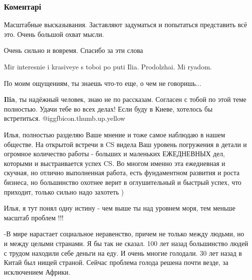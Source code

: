  
 
 
 
 
\subsubsection{Коментарі}

\begin{itemize} %
Масштабные высказывания. Заставляют задуматься и попытаться представить всё это. Очень большой охват мысли.

Очень сильно и вовремя. Спасибо за эти слова

Mir interesnie i krasiveye s toboi po puti Ilia. Prodolzhai. Mi ryadom.

По моим ощущениям, ты знаешь что-то еще, о чем не говоришь...

\textbf{Ilia}, ты надёжный человек, знаю не по рассказам. Согласен с тобой по этой теме полностью. Удачи тебе во всех делах! Если буду в Киеве, хотелось бы встретиться.  @igg{fbicon.thumb.up.yellow} 


Илья, полностью разделяю Ваше мнение и тоже самое наблюдаю в нашем обществе. На
открытой встречи в CS видела Ваш уровень погружения в детали и огромное
количество работы - больших и маленьких ЕЖЕДНЕВНЫХ дел, которыми и
выстраивается успех CS. Во многом именно эта ежедневная и скучная, но отлично
выполненная работа, есть фундаментном развития и роста бизнеса, но большинство
охотнее верит в оглушительный и быстрый успех, что приходит, только сильно надо
захотеть )


Илья, я тут понял одну истину - чем выше ты над уровнем моря, тем меньше масштаб проблем !!!


-В мире нарастает социальное неравенство, причем не только между людьми, но и между целыми странами.
Я бы так не сказал.
100 лет назад большинство людей с трудом находили себе деньги на еду. И очень многие голодали.
30 лет назад в Китай был нищей страной.
Сейчас проблема голода решена почти везде, за исключением Африки.


\end{itemize}
